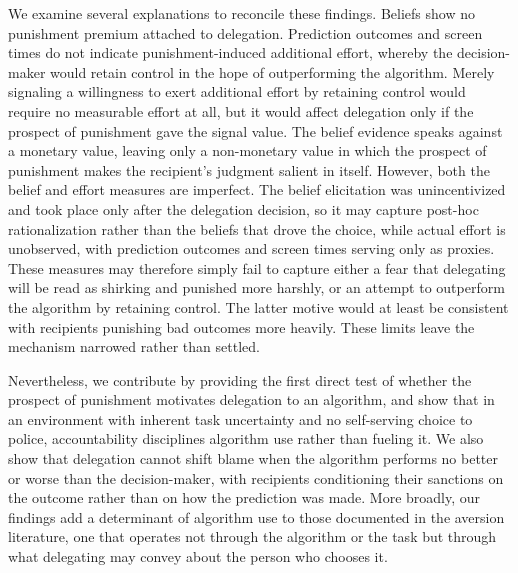 We examine several explanations to reconcile these findings. %
Beliefs show no punishment premium attached to delegation. Prediction outcomes and screen times do not indicate punishment-induced additional effort, whereby the decision-maker would retain control in the hope of outperforming the algorithm. Merely signaling a willingness to exert additional effort by retaining control would require no measurable effort at all, but it would affect delegation only if the prospect of punishment gave the signal value. The belief evidence speaks against a monetary value, leaving only a non-monetary value in which the prospect of punishment makes the recipient's judgment salient in itself. However, both the belief and effort measures are imperfect. The belief elicitation was unincentivized and took place only after the delegation decision, so it may capture post-hoc rationalization rather than the beliefs that drove the choice, while actual effort is unobserved, with prediction outcomes and screen times serving only as proxies. These measures may therefore simply fail to capture either a fear that delegating will be read as shirking and punished more harshly, or an attempt to outperform the algorithm by retaining control. The latter motive would at least be consistent with recipients punishing bad outcomes more heavily. These limits leave the mechanism narrowed rather than settled.

Nevertheless, we contribute by providing the first direct test of whether the prospect of punishment motivates delegation to an algorithm, and show that in an environment with inherent task uncertainty and no self-serving choice to police, accountability disciplines algorithm use rather than fueling it. We also show that delegation cannot shift blame when the algorithm performs no better or worse than the decision-maker, with recipients conditioning their sanctions on the outcome rather than on how the prediction was made. More broadly, our findings add a determinant of algorithm use to those documented in the aversion literature, one that operates not through the algorithm or the task but through what delegating may convey about the person who chooses it.